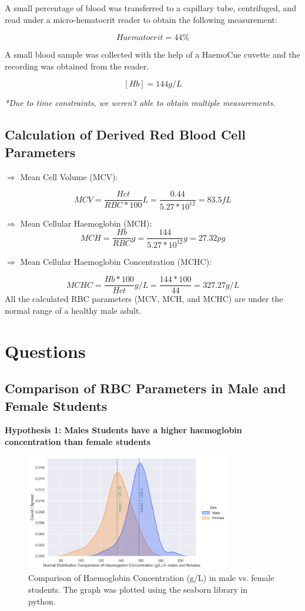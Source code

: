 \documentclass[pdflatex,sn-mathphys]{sn-jnl}%
\theoremstyle{thmstyleone}%
\theoremstyle{thmstyletwo}%
\theoremstyle{thmstylethree}%
\begin{document}
A small percentage of blood was transferred to a capillary tube, centrifuged, and read under a micro-hematocrit reader to obtain the following measurement:

\[Haematocrit = 44\%\]\vspace{0.3mm}

A small blood sample was collected with the help of a HaemoCue cuvette and the recording was obtained from the reader.

\[[Hb] =  144g/L\]\vspace{0.3mm}

\textit{*Due to time constraints, we weren't able to obtain multiple measurements.}

\subsection{Calculation of Derived Red Blood Cell Parameters}
$\Rightarrow$ Mean Cell Volume (MCV):

\[MCV = \frac{Hct}{RBC * 100}L =  \frac{0.44}{5.27 * 10^{12}} = 83.5 fL\]\vspace{2mm}

\noindent $\Rightarrow$ Mean Cellular Haemoglobin (MCH):
\[MCH = \frac{Hb}{RBC}g = \frac{144}{5.27 * 10^{12}}g = 27.32 pg\]\vspace{2mm}

\noindent $\Rightarrow$ Mean Cellular Haemoglobin Concentration (MCHC):

\[MCHC = \frac{Hb * 100}{Hct}g/L = \frac{144 * 100}{44} = 327.27g/L\]
All the calculated RBC parameters (MCV, MCH, and MCHC) are under the normal range of a healthy male adult.
\newpage

\section{Questions }
\subsection{Comparison of RBC Parameters in Male and Female Students}
\textbf{Hypothesis 1: Males Students have a higher haemoglobin concentration than female students}
\begin{figure}[hp]
    \centering
    \includegraphics[width=0.8\textwidth]{photos/hyp_1.png}
    \caption{Comparison of Haemoglobin Concentration (g/L) in male vs. female students. The graph was plotted using the seaborn library in python. }\label{fig1}
\end{figure}
\vspace{-15pt}
\end{document}
